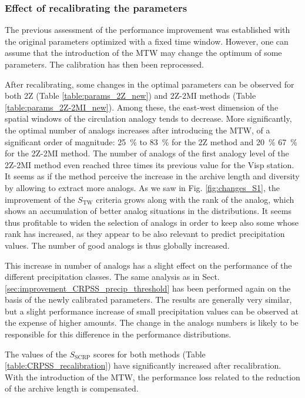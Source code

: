 \documentclass[hess, manuscript]{copernicus}
\begin{document}
\subsubsection{Effect of recalibrating the parameters}
\label{sec:recalibration}

The previous assessment of the performance improvement was established with the original parameters optimized with a fixed time window. However, one can assume that the introduction of the MTW may change the optimum of some parameters. The calibration has then been reprocessed.

After recalibrating, some changes in the optimal parameters can be observed for both 2Z (Table \ref{table:params_2Z_new}) and 2Z-2MI methods (Table \ref{table:params_2Z-2MI_new}). Among these, the east-west dimension of the spatial windows of the circulation analogy tends to decrease. More significantly, the optimal number of analogs increases after introducing the MTW, of a significant order of magnitude: 25~\% to 83~\% for the 2Z method and 20~\% 67~\% for the 2Z-2MI method. The number of analogs of the first analogy level of the 2Z-2MI method even reached three times its previous value for the Visp station. It seems as if the method perceive the increase in the archive length and diversity by allowing to extract more analogs. As we saw in Fig. \ref{fig:changes_S1}, the improvement of the $S_{\text{TW}}$ criteria grows along with the rank of the analog, which shows an accumulation of better analog situations in the distributions. It seems thus profitable to widen the selection of analogs in order to keep also some whose rank has increased, as they appear to be also relevant to predict precipitation values. The number of good analogs is thus globally increased.

This increase in number of analogs has a slight effect on the performance of the different precipitation classes. The same analysis as in Sect. \ref{sec:improvement_CRPSS_precip_threshold} has been performed again on the basis of the newly calibrated parameters. The results are generally very similar, but a slight performance increase of small precipitation values can be observed at the expense of higher amounts. The change in the analogs numbers is likely to be responsible for this difference in the performance distributions.

The values of the $S_{\text{SCRP}}$ scores for both methods (Table \ref{table:CRPSS_recalibration}) have significantly increased after recalibration. With the introduction of the MTW, the performance loss related to the reduction of the archive length is compensated.
\end{document}

